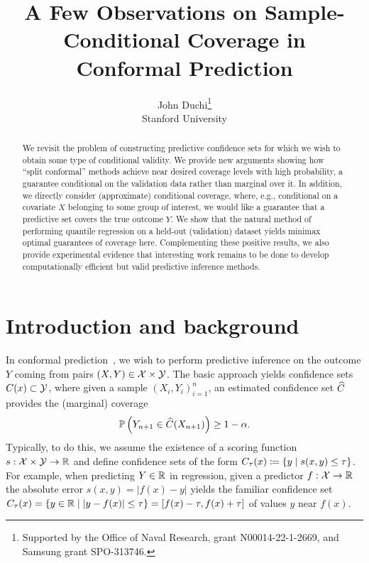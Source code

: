 \documentclass[11pt]{article}
\newcommand{\scorefunc}{s}
\begin{document}
\title{A Few Observations on Sample-Conditional Coverage in
  \\ Conformal Prediction}
\author{John Duchi\thanks{Supported by the Office of Naval
    Research, grant N00014-22-1-2669, and Samsung grant SPO-313746.} \\
Stanford University}

\maketitle

\begin{abstract}
  We revisit the problem of constructing predictive confidence sets
  for which we wish to obtain some type of conditional
  validity.
  We provide new arguments showing how ``split conformal'' methods
  achieve near desired coverage levels with high probability, a
  guarantee conditional on the validation data rather than
  marginal over it.
  In addition, we directly consider (approximate) conditional coverage,
  where, e.g., conditional on a covariate $X$ belonging to some
  group of interest, we would like a guarantee that a predictive set
  covers the true outcome $Y$.
  We show that the natural method of performing quantile regression on a
  held-out (validation) dataset yields minimax optimal guarantees of
  coverage here.
  Complementing these positive results, we also provide experimental
  evidence that interesting work remains to be done to develop
  computationally efficient but valid predictive inference methods.
\end{abstract}

\section{Introduction and background}

In conformal
prediction~\cite{VovkGaSh05,LeiWa14,LeiGSRiTiWa18,BarberCaRaTi21a}, we wish
to perform predictive inference on the outcome $Y$ coming from pairs $(X, Y)
\in \mathcal{X} \times \mathcal{Y}$.
%
The basic approach yields confidence sets $C(x) \subset \mathcal{Y}$, where given
a sample $(X_i, Y_i)_{i = 1}^n$, an estimated confidence set
$\widehat{C}$ provides the (marginal) coverage
\begin{equation}
  \label{eqn:marginal-guarantee}
  \mathbb{P}\left(Y_{n + 1} \in \widehat{C}(X_{n + 1})\right) \ge 1 - \alpha.
\end{equation}
%
Typically, to do this, we assume the existence of a scoring function
$\scorefunc : \mc{X} \times \mc{Y} \to \R$ and define confidence sets
of the form $C_\tau(x) \defeq \{y \mid \scorefunc(x, y) \le \tau\}$.
%
For example, when predicting $Y \in \mathbb{R}$ in regression, given a
predictor $f : \mathcal{X} \to \mathbb{R}$ the absolute error $\scorefunc(x, y) =
|f(x) - y|$ yields the familiar confidence set $C_\tau(x) = \{y \in \mathbb{R} \mid
|y - f(x)| \le \tau\} = [f(x) - \tau, f(x) + \tau]$ of values $y$ near
$f(x)$.
\end{document}
